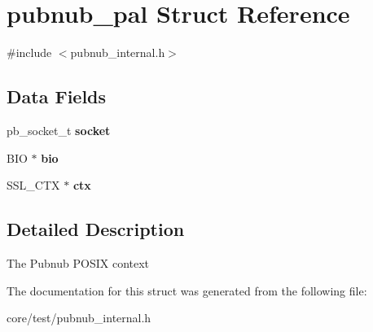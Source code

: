 \hypertarget{structpubnub__pal}{\section{pubnub\-\_\-pal Struct Reference}
\label{structpubnub__pal}
}


{\ttfamily \#include $<$pubnub\-\_\-internal.\-h$>$}

\subsection*{Data Fields}
\begin{DoxyCompactItemize}
\item 
\hypertarget{structpubnub__pal_aed75dad0dfcf40fab1a5c37425b55261}{pb\-\_\-socket\-\_\-t {\bfseries socket}}\label{structpubnub__pal_aed75dad0dfcf40fab1a5c37425b55261}

\item 
\hypertarget{structpubnub__pal_ac61d35810b82c089d34207248b2fbcb4}{B\-I\-O $\ast$ {\bfseries bio}}\label{structpubnub__pal_ac61d35810b82c089d34207248b2fbcb4}

\item 
\hypertarget{structpubnub__pal_adb5d4a1a08ef9f02880d21dae7d00cd8}{S\-S\-L\-\_\-\-C\-T\-X $\ast$ {\bfseries ctx}}\label{structpubnub__pal_adb5d4a1a08ef9f02880d21dae7d00cd8}

\end{DoxyCompactItemize}


\subsection{Detailed Description}
The Pubnub P\-O\-S\-I\-X context 

The documentation for this struct was generated from the following file\-:\begin{DoxyCompactItemize}
\item 
core/test/pubnub\-\_\-internal.\-h\end{DoxyCompactItemize}
